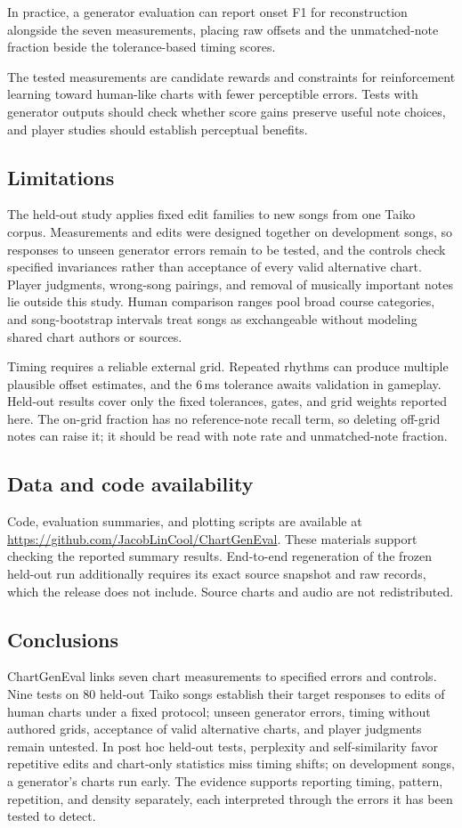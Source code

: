 \documentclass[letterpaper]{article}
\begin{document}
In practice, a generator evaluation can report onset F1 for reconstruction
alongside the seven measurements, placing raw offsets and the
unmatched-note fraction beside the tolerance-based timing scores.

The tested measurements are candidate rewards and constraints for
reinforcement learning toward human-like charts with fewer perceptible
errors. Tests with generator
outputs should check whether score gains preserve useful note choices, and
player studies should establish perceptual benefits.

\subsection{Limitations}
The held-out study applies fixed edit families to new songs from one Taiko
corpus. Measurements and edits were designed together on development songs,
so responses to unseen generator errors remain to be tested, and the
controls check specified invariances rather than acceptance of every valid
alternative chart. Player judgments, wrong-song pairings, and removal of
musically important notes lie outside this study. Human comparison ranges
pool broad course categories, and song-bootstrap intervals treat songs as
exchangeable without modeling shared chart authors or sources.

Timing requires a reliable external grid. Repeated rhythms can produce
multiple plausible offset estimates, and the 6\,ms tolerance awaits
validation in gameplay. Held-out results cover only the fixed tolerances,
gates, and grid weights reported here. The on-grid fraction has no reference-note recall
term, so deleting off-grid notes can raise it; it should be read with
note rate and unmatched-note fraction.

\subsection{Data and code availability}
Code, evaluation summaries, and plotting scripts are available at
\url{https://github.com/JacobLinCool/ChartGenEval}. These materials support
checking the reported summary results. End-to-end regeneration of the
frozen held-out run additionally requires its exact source snapshot and raw
records, which the release does not include. Source charts and audio are
not redistributed.

\subsection{Conclusions}
ChartGenEval links seven chart measurements to specified errors and
controls. Nine tests on 80 held-out Taiko songs establish their target
responses to edits of human charts under a fixed protocol; unseen
generator errors, timing without authored grids, acceptance of valid
alternative charts, and player judgments remain untested.
In post hoc held-out tests, perplexity and self-similarity favor repetitive
edits and chart-only statistics miss timing shifts; on development songs, a
generator's charts run early.
The evidence supports reporting timing, pattern, repetition, and density
separately, each interpreted through the errors it has been tested to
detect.
\end{document}
